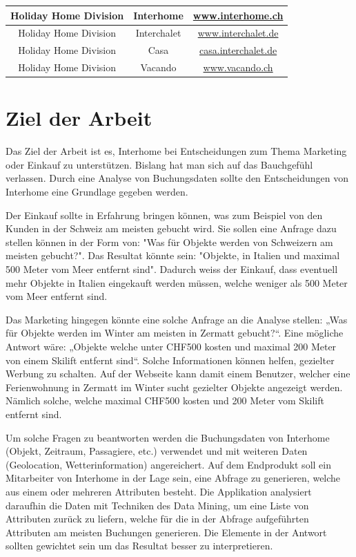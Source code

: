 \begin{table}[h]
\begin{tabular}{ | c | c | c |}
		Holiday Home Division & Interhome & \href{http://www.interhome.ch}{www.interhome.ch} \\ \hline 
		Holiday Home Division & Interchalet & \href{http://www.interchalet.de}{www.interchalet.de} \\ \hline 
		Holiday Home Division & Casa & \href{http://casa.interchalet.de}{casa.interchalet.de} \\ \hline 
		Holiday Home Division & Vacando & \href{http://www.vacando.ch}{www.vacando.ch} \\ \hline 
	\end{tabular}
\end{table}

\section{Ziel der Arbeit}
\label{sec:einleitung:ziel}
Das Ziel der Arbeit ist es, Interhome bei Entscheidungen zum Thema Marketing oder Einkauf zu unterstützen. Bislang hat man sich auf das Bauchgefühl verlassen. Durch eine Analyse von Buchungsdaten sollte den Entscheidungen von Interhome eine Grundlage gegeben werden. 

Der Einkauf sollte in Erfahrung bringen können, was zum Beispiel von den Kunden in der Schweiz am meisten gebucht wird. Sie sollen eine Anfrage dazu stellen können in der Form von: "Was für Objekte werden von Schweizern am meisten gebucht?". Das Resultat könnte sein: "Objekte, in Italien und maximal 500 Meter vom Meer entfernt sind". Dadurch weiss der Einkauf, dass eventuell mehr Objekte in Italien eingekauft werden müssen, welche weniger als 500 Meter vom Meer entfernt sind.

Das Marketing hingegen könnte eine solche Anfrage an die Analyse stellen: „Was für Objekte werden im Winter am meisten in Zermatt gebucht?“. Eine mögliche Antwort wäre: „Objekte welche unter CHF500 kosten und maximal 200 Meter von einem Skilift entfernt sind“. Solche Informationen können helfen, gezielter Werbung zu schalten. Auf der Webseite kann damit einem Benutzer, welcher eine Ferienwohnung in Zermatt im Winter sucht gezielter Objekte angezeigt werden. Nämlich solche, welche maximal CHF500 kosten und 200 Meter vom Skilift entfernt sind.

Um solche Fragen zu beantworten werden die Buchungsdaten von Interhome (Objekt, Zeitraum, Passagiere, etc.) verwendet und mit weiteren Daten (Geolocation, Wetterinformation) angereichert. 
Auf dem Endprodukt soll ein Mitarbeiter von Interhome in der Lage sein, eine Abfrage zu generieren, welche aus einem oder mehreren Attributen besteht. Die Applikation analysiert daraufhin die Daten mit Techniken des Data Mining, um eine Liste von Attributen zurück zu liefern, welche für die in der Abfrage aufgeführten Attributen am meisten Buchungen generieren. Die Elemente in der Antwort sollten gewichtet sein um das Resultat besser zu interpretieren.

